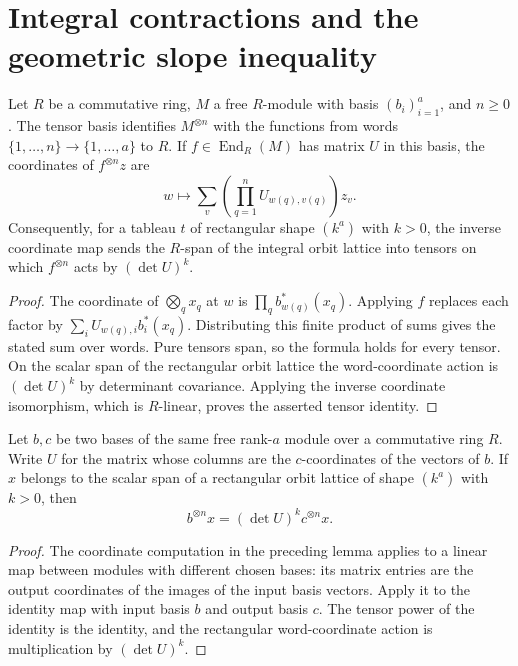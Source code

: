 \chapter{Integral contractions and the geometric slope inequality}

\begin{lemma}
\label{lem:rectangular-tensor-realization}
\leanok
Let $R$ be a commutative ring, $M$ a free $R$-module with basis
$(b_i)_{i=1}^a$, and $n\geq0$. The tensor basis identifies $M^{\otimes n}$
with the functions from words $\{1,\ldots,n\}\to\{1,\ldots,a\}$ to $R$.
If $f\in\operatorname{End}_R(M)$ has matrix $U$ in this basis, the
coordinates of $f^{\otimes n}z$ are
\[
 w\longmapsto\sum_v\left(\prod_{q=1}^nU_{w(q),v(q)}\right)z_v.
\]
Consequently, for a tableau $t$ of rectangular shape $(k^a)$ with $k>0$,
the inverse coordinate map sends the $R$-span of the integral orbit
lattice into tensors on which $f^{\otimes n}$ acts by $(\det U)^k$.
\end{lemma}
\begin{proof}
The coordinate of $\bigotimes_q x_q$ at $w$ is
$\prod_q b^*_{w(q)}(x_q)$. Applying $f$ replaces each factor by
$\sum_i U_{w(q),i}b_i^*(x_q)$. Distributing this finite product of
sums gives the stated sum over words. Pure tensors span, so the
formula holds for every tensor. On the scalar span of the rectangular
orbit lattice the word-coordinate action is $(\det U)^k$ by
determinant covariance. Applying the inverse coordinate isomorphism,
which is $R$-linear, proves the asserted tensor identity.
\end{proof}

\begin{lemma}
\label{lem:rectangular-change-frame}
\leanok
Let $b,c$ be two bases of the same free rank-$a$ module over a
commutative ring $R$. Write $U$ for the matrix whose columns are the
$c$-coordinates of the vectors of $b$. If $x$ belongs to the scalar
span of a rectangular orbit lattice of shape $(k^a)$ with $k>0$, then
\[
 b^{\otimes n}x=(\det U)^k c^{\otimes n}x.
\]
\end{lemma}
\begin{proof}
The coordinate computation in the preceding lemma applies to a linear
map between modules with different chosen bases: its matrix entries
are the output coordinates of the images of the input basis vectors.
Apply it to the identity map with input basis $b$ and output basis $c$.
The tensor power of the identity is the identity, and the rectangular
word-coordinate action is multiplication by $(\det U)^k$.
\end{proof}

